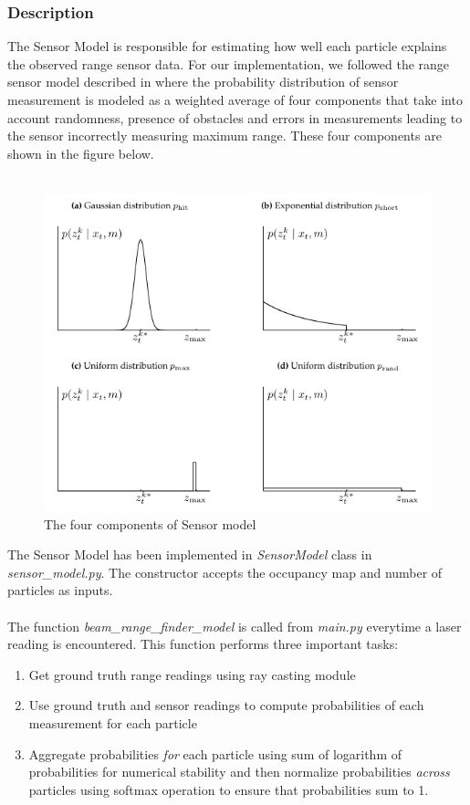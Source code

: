 \documentclass[12pt, a4paper]{article}
\begin{document}
\subsubsection{Description}
The Sensor Model is responsible for estimating how well each particle explains the observed range sensor data. For our implementation, we followed the range sensor model described in \cite{ProbRob} where the probability distribution of sensor measurement is modeled as a weighted average of four components that take into account randomness, presence of obstacles and errors in measurements leading to the sensor incorrectly measuring maximum range. These four components are shown in the figure below.\\\\
\begin{figure}[H]
  \centering
  \includegraphics[width=0.9\linewidth]{results/sensor_model_pic.png}
  \caption{The four components of Sensor model}
\end{figure}

The Sensor Model has been implemented in \textit{SensorModel} class in \textit{sensor\_model.py}. The constructor accepts the occupancy map and number of particles as inputs.\\\\
The function \textit{beam\_range\_finder\_model} is called from \textit{main.py} everytime a laser reading is encountered. This function performs three important tasks:
\begin{enumerate}
  \item Get ground truth range readings using ray casting module
  \item Use ground truth and sensor readings to compute probabilities of each measurement for each particle
  \item Aggregate probabilities \textit{for} each particle using sum of logarithm of probabilities for numerical stability and then normalize probabilities \textit{across} particles using softmax operation to ensure that probabilities sum to 1.
\end{enumerate}
\end{document}
